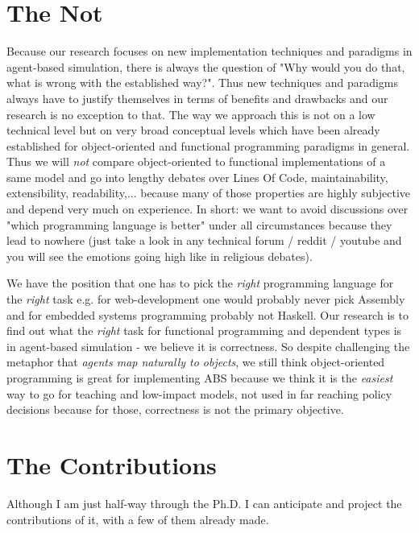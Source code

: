 \section{The Not}
Because our research focuses on new implementation techniques and paradigms in agent-based simulation, there is always the question of "Why would you do that, what is wrong with the established way?". Thus new techniques and paradigms always have to justify themselves in terms of benefits and drawbacks and our research is no exception to that. The way we approach this is not on a low technical level but on very broad conceptual levels which have been already established for object-oriented and functional programming paradigms in general. Thus we will \textit{not} compare object-oriented to functional implementations of a same model and go into lengthy debates over Lines Of Code, maintainability, extensibility, readability,... because many of those properties are highly subjective and depend very much on experience. In short: we want to avoid discussions over "which programming language is better" under all circumstances because they lead to nowhere (just take a look in any technical forum / reddit / youtube and you will see the emotions going high like in religious debates).

We have the position that one has to pick the \textit{right} programming language for the \textit{right} task e.g. for web-development one would probably never pick Assembly and for embedded systems programming probably not Haskell. Our research is to find out what the \textit{right} task for functional programming and dependent types is in agent-based simulation - we believe it is correctness. So despite challenging the metaphor that \textit{agents map naturally to objects}, we still think object-oriented programming is great for implementing ABS because we think it is the \textit{easiest} way to go for teaching and low-impact models, not used in far reaching policy decisions because for those, correctness is not the primary objective.

\section{The Contributions}
Although I am just half-way through the Ph.D. I can anticipate and project the contributions of it, with a few of them already made.